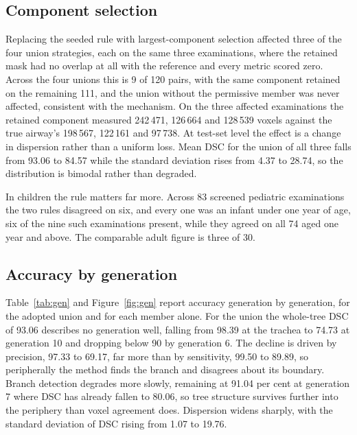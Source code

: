 \documentclass[runningheads]{llncs}
\begin{document}
\subsection{Component selection}
\label{sec:res-selection}
Replacing the seeded rule with largest-component selection affected three of the
four union strategies, each on the same three examinations, where the retained
mask had no overlap at all with the reference and every metric scored zero.
Across the four unions this is 9 of 120 pairs, with the same component retained
on the remaining 111, and the union without the permissive member was never
affected, consistent with the mechanism. On the three affected examinations the
retained component measured 242\,471, 126\,664 and 128\,539 voxels against the
true airway's 198\,567, 122\,161 and 97\,738. At test-set level the effect is a
change in dispersion rather than a uniform loss. Mean DSC for the union of all
three falls from 93.06 to 84.57 while the standard deviation rises from 4.37 to
28.74, so the distribution is bimodal rather than degraded.

In children the rule matters far more. Across 83 screened pediatric
examinations the two rules disagreed on six, and every one was an infant under
one year of age, six of the nine such examinations present, while they agreed on
all 74 aged one year and above. The comparable adult figure is three of 30.

\subsection{Accuracy by generation}
Table~\ref{tab:gen} and Figure~\ref{fig:gen} report accuracy generation by
generation, for the adopted union and for each member alone. For the union the
whole-tree DSC of 93.06 describes no generation well, falling from 98.39 at the
trachea to 74.73 at generation 10 and dropping below 90 by generation 6. The
decline is driven by precision, 97.33 to 69.17, far more than by sensitivity,
99.50 to 89.89, so peripherally the method finds the branch and disagrees about
its boundary. Branch detection degrades more slowly, remaining at 91.04 per cent
at generation 7 where DSC has already fallen to 80.06, so tree structure
survives further into the periphery than voxel agreement does. Dispersion widens
sharply, with the standard deviation of DSC rising from 1.07 to 19.76.
\end{document}
